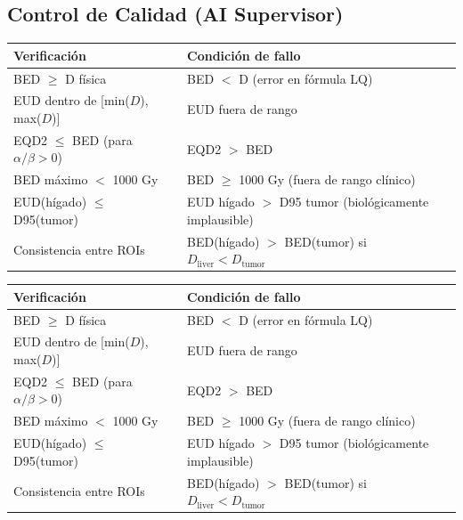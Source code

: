 \documentclass[12pt,a4paper]{article}
\begin{document}
\begin{tcolorbox}[aiSupervisor]
\subsection*{Control de Calidad (AI Supervisor)}

\begin{tabular}{p{5cm} p{10cm}}
\toprule
\textbf{Verificación} & \textbf{Condición de fallo} \\
\midrule
BED $\geq$ D física & BED $<$ D (error en fórmula LQ) \\
EUD dentro de [min($D$), max($D$)] & EUD fuera de rango \\
EQD2 $\leq$ BED (para $\alpha/\beta > 0$) & EQD2 $>$ BED \\
BED máximo $<$ 1000 Gy & BED $\geq$ 1000 Gy (fuera de rango clínico) \\
EUD(hígado) $\leq$ D95(tumor) & EUD hígado $>$ D95 tumor (biológicamente implausible) \\
Consistencia entre ROIs & BED(hígado) $>$ BED(tumor) si $D_{\text{liver}} < D_{\text{tumor}}$ \\
\bottomrule
\end{tabular}

\newpage




\begin{tabular}{p{5cm} p{10cm}}
\toprule
\textbf{Verificación} & \textbf{Condición de fallo} \\
\midrule
BED $\geq$ D física & BED $<$ D (error en fórmula LQ) \\
EUD dentro de [min($D$), max($D$)] & EUD fuera de rango \\
EQD2 $\leq$ BED (para $\alpha/\beta > 0$) & EQD2 $>$ BED \\
BED máximo $<$ 1000 Gy & BED $\geq$ 1000 Gy (fuera de rango clínico) \\
EUD(hígado) $\leq$ D95(tumor) & EUD hígado $>$ D95 tumor (biológicamente implausible) \\
Consistencia entre ROIs & BED(hígado) $>$ BED(tumor) si $D_{\text{liver}} < D_{\text{tumor}}$ \\
\bottomrule
\end{tabular}

\newpage

\end{tcolorbox}
\end{document}
